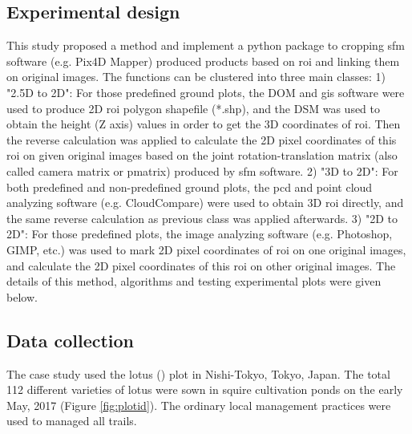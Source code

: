 \documentclass[sensors,article,submit,moreauthors, xelatex]{Definitions/mdpi}
\begin{document}
\subsection{Experimental design}
This study proposed a method and implement a python package to cropping \acrshort*{sfm} software (e.g. Pix4D Mapper) produced products based on \acrfull*{roi} and linking them on original images. The functions can be clustered into three main classes: 1) "2.5D to 2D": For those predefined ground plots, the DOM and \acrfull*{gis} software were used to produce 2D \acrshort*{roi} polygon shapefile (*.shp), and the DSM was used to obtain the height (Z axis) values in order to get the 3D coordinates of \acrshort*{roi}. Then the reverse calculation was applied to calculate the 2D pixel coordinates of this \acrshort*{roi} on given original images based on the joint rotation-translation matrix (also called camera matrix or pmatrix) produced by \acrshort*{sfm} software. 2) "3D to 2D": For both predefined and non-predefined ground plots, the \acrfull*{pcd} and point cloud analyzing software (e.g. CloudCompare) were used to obtain 3D \acrshort*{roi} directly, and the same reverse calculation as previous class was applied afterwards. 3) "2D to 2D": For those predefined plots, the image analyzing software (e.g. Photoshop, GIMP, etc.) was used to mark 2D pixel coordinates of \acrshort*{roi} on one original images, and calculate the 2D pixel coordinates of this \acrshort*{roi} on other original images. The details of this method, algorithms and testing experimental plots were given below.

\subsection{Data collection}

The case study used the lotus () plot in Nishi-Tokyo, Tokyo, Japan. The total 112 different varieties of lotus were sown in squire cultivation ponds on the early May, 2017 (Figure \ref{fig:plotid}). The ordinary local management practices were used to managed all trails.
\end{document}
